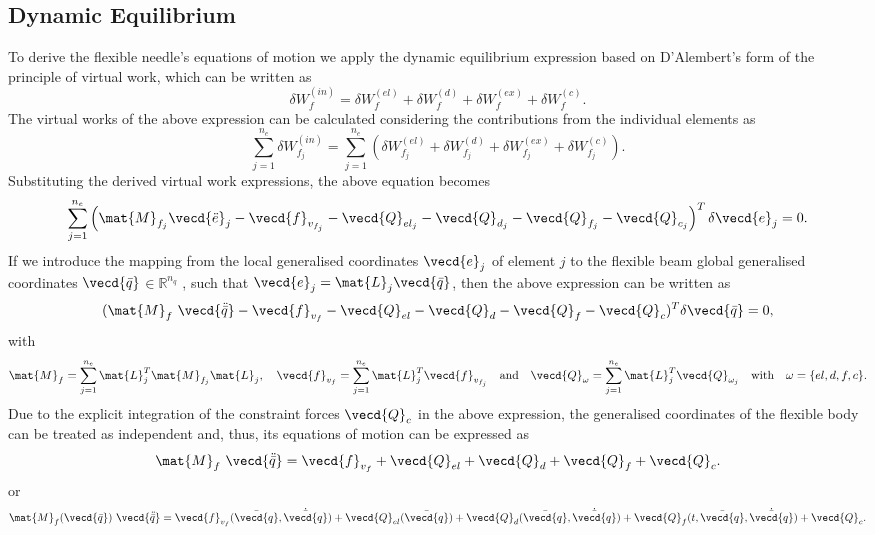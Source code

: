 \subsection{Dynamic Equilibrium}
To derive the flexible needle's equations of motion we apply the dynamic equilibrium expression based on D'Alembert's form of the principle of virtual work, which can be written as
\[
    \delta W_{f}^{(in)} = \delta W_{f}^{(el)} + 
    \delta W_{f}^{(d)} +  \delta W_{f}^{(ex)} + \delta W_{f}^{(c)}.
\]
The virtual works of the above expression can be calculated considering the contributions from the individual elements as
\[
    \sum_{j=1}^{n_{e}} \delta W_{f_{j}}^{(in)} = \sum_{j=1}^{n_{e}} \left(\delta W_{f_{j}}^{(el)} + 
    \delta W_{f_{j}}^{(d)} +  \delta W_{f_{j}}^{(ex)} + \delta W_{f_{j}}^{(c)}
    \right).
\]
Substituting the derived virtual work expressions, the above equation becomes
\[
    \sum_{j=1}^{n_{e}} \left(\mat{M}_{f_{j}}\vecd{\ddot{e}}_{j} - \vecd{f}_{v_{f_j}} 
     - \vecd{Q}_{el_j} - \vecd{Q}_{d_j} - \vecd{Q}_{f_j} - \vecd{Q}_{c_j} \right)^{T} \delta \vecd{e}_{j} = 0.
\]
If we introduce the mapping from the local generalised coordinates 
$\vecd{e}_{j}$ of element $j$ to the flexible beam global generalised coordinates
$\vecd{\bar{q}} $$\in \mathbb{R}^{n_q}$ , such that $\vecd{e}_{j} = \mat{L}_{j} \vecd{\bar{q}}$, then the above expression can be written as
\begin{equation}
    (\mat{M}_{f}\ \vecd{\ddot{\bar{q}}} - \vecd{f}_{v_f} - \vecd{Q}_{el} -
    \vecd{Q}_{d} - \vecd{Q}_{f} - \vecd{Q}_{c})^{T} \delta\vecd{\bar{q}} = 0,
\end{equation}
with
\small
\begin{equation}
    \mat{M}_{f} = \sum\limits_{j=1}^{n_{e}}\mat{L}_{j}^{T} \mat{M}_{f_j} \mat{L}_{j}, 
    \quad 
    \vecd{f}_{v_f} = \sum\limits_{j=1}^{n_{e}}\mat{L}_{j}^{T} \vecd{f}_{v_{f_j}}
    \quad \text{and} \quad 
    \vecd{Q}_{\omega} = \sum\limits_{j=1}^{n_{e}}\mat{L}_{j}^{T} \vecd{Q}_{\omega_{j}}
    \quad \text{with} \quad \omega = \{el, d, f, c \}.
    \label{eq:matrices_sums}
\end{equation}
\normalsize
Due to the explicit integration of the constraint forces $\vecd{Q}_{c}$ in the
above expression, the generalised coordinates of the flexible body can be
treated as independent and, thus, its equations of motion can be expressed as
\begin{equation}
    \mat{M}_{f}\ \vecd{\ddot{\bar{q}}} = \vecd{f}_{v_f} + \vecd{Q}_{el} +
    \vecd{Q}_{d} + \vecd{Q}_{f} + \vecd{Q}_{c}.
    \label{eq:equations_of_motion}
\end{equation}
or
\begin{equation}
    \mat{M}_{f}(\vecd{\bar{q}})\ \vecd{\ddot{\bar{q}}} =
    \vecd{f}_{v_f}(\bar{\vecd{q}}, \dot{\bar{\vecd{q}}}) +
    \vecd{Q}_{el}(\bar{\vecd{q}}) + \vecd{Q}_{d}(\bar{\vecd{q}}, \dot{\bar{\vecd{q}}})
    + \vecd{Q}_{f}(t, \bar{\vecd{q}}, \dot{\bar{\vecd{q}}}) +
    \vecd{Q}_{c}.
    \label{eq:equations_of_motion_complete}
\end{equation}


